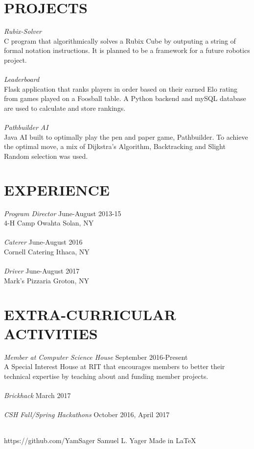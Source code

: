 \documentclass[margin]{res}
\begin{document}
\begin{resume}
\section{PROJECTS} {\sl Rubix-Solver}\\
			C program that algorithmically solves a Rubix Cube
			by outputing a string of formal notation instructions.
			It is planned to be a framework for a future robotics project.\\\\
		{\sl Leaderboard}\\
			Flask application that ranks players in order based
			on their earned Elo rating from games played on a
			Foosball table. A Python backend and mySQL database are 
			used to calculate and store rankings.\\\\ 
		{\sl Pathbuilder AI}\\
			Java AI built to optimally play the pen and paper game,
			Pathbuilder. To achieve the optimal move, a mix of 
			Dijkstra's Algorithm, Backtracking and Slight Random selection was used.

\section{EXPERIENCE} {\sl Program Director} \hfill June-August 2013-15\\
			4-H Camp Owahta Solan, NY\\\\
			{\sl Caterer} \hfill June-August 2016\\
			Cornell Catering Ithaca, NY\\\\
			{\sl Driver} \hfill June-August 2017\\
			Mark's Pizzaria Groton, NY

\section{EXTRA-CURRICULAR \\ ACTIVITIES}             
        	{\sl Member at Computer Science House} \hfill 	September 2016-Present\\
		A Special Interest House at RIT that encourages members to better their technical expertise by teaching about and funding member projects.\\\\ 
		{\sl Brickhack}  \hfill 				March 2017\\\\
		{\sl CSH Fall/Spring Hackathons} \hfill 		October 2016, April 2017\\\\

\end{resume}

\scriptsize{https://github.com/YamSager} \hfill 
\scriptsize{Samuel L. Yager} \hfill 
\scriptsize{Made in \LaTeX}
\end{document}
